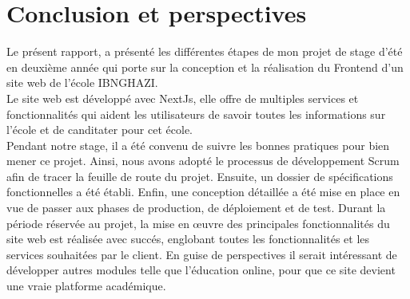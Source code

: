 \chapter*{Conclusion et perspectives}
Le présent rapport, a présenté les différentes étapes de mon projet de stage d'été en deuxième année qui porte sur la conception et la réalisation du Frontend d'un site web de l'école IBNGHAZI.\\

Le site web est développé avec NextJs, elle offre de multiples services et fonctionnalités qui aident les utilisateurs de savoir toutes les informations sur l'école et de canditater pour cet école.\\

Pendant notre stage, il a été convenu de suivre les bonnes pratiques pour bien mener ce projet. Ainsi, nous avons adopté le processus de développement Scrum afin de tracer la feuille de route du projet. Ensuite, un dossier de spécifications fonctionnelles a été établi. Enfin, une conception détaillée a été mise en place en vue de passer aux phases de production, de déploiement et de test. Durant la période réservée au projet, la mise en œuvre des principales fonctionnalités du site web est réalisée avec succés, englobant toutes les
fonctionnalités et les services souhaitées par le client. En guise de perspectives il serait intéressant de développer autres modules telle que l’éducation online, pour que ce site devient une vraie platforme académique.\\



